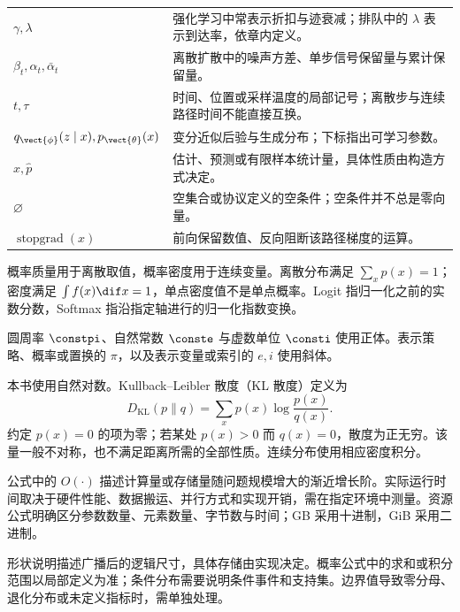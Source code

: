 \begin{longtable}{p{.18\linewidth}p{.73\linewidth}}
$\gamma,\lambda$ & 强化学习中常表示折扣与迹衰减；排队中的 $\lambda$ 表示到达率，依章内定义。\\
$\beta_t,\alpha_t,\bar\alpha_t$ & 离散扩散中的噪声方差、单步信号保留量与累计保留量。\\
$t,\tau$ & 时间、位置或采样温度的局部记号；离散步与连续路径时间不能直接互换。\\
$q_{\vect{\phi}}(z\mid x),p_{\vect{\theta}}(x)$ & 变分近似后验与生成分布；下标指出可学习参数。\\
$\widehat x,\widehat p$ & 估计、预测或有限样本统计量，具体性质由构造方式决定。\\
$\varnothing$ & 空集合或协议定义的空条件；空条件并不总是零向量。\\
$\operatorname{stopgrad}(x)$ & 前向保留数值、反向阻断该路径梯度的运算。\\
\bottomrule
\end{longtable}

概率质量用于离散取值，概率密度用于连续变量。离散分布满足 $\sum_xp(x)=1$；密度满足 $\int f(x)\dif x=1$，单点密度值不是单点概率。Logit 指归一化之前的实数分数，Softmax 指沿指定轴进行的归一化指数变换。

圆周率 $\constpi$、自然常数 $\conste$ 与虚数单位 $\consti$ 使用正体。表示策略、概率或置换的 $\pi$，以及表示变量或索引的 $e,i$ 使用斜体。

本书使用自然对数。Kullback--Leibler 散度（KL 散度）定义为
\begin{equation*}
 D_{\mathrm{KL}}(p\|q)=\sum_xp(x)\log\frac{p(x)}{q(x)}.
\end{equation*}
约定 $p(x)=0$ 的项为零；若某处 $p(x)>0$ 而 $q(x)=0$，散度为正无穷。该量一般不对称，也不满足距离所需的全部性质。连续分布使用相应密度积分。

公式中的 $O(\cdot)$ 描述计算量或存储量随问题规模增大的渐近增长阶。实际运行时间取决于硬件性能、数据搬运、并行方式和实现开销，需在指定环境中测量。资源公式明确区分参数数量、元素数量、字节数与时间；GB 采用十进制，GiB 采用二进制。

形状说明描述广播后的逻辑尺寸，具体存储由实现决定。概率公式中的求和或积分范围以局部定义为准；条件分布需要说明条件事件和支持集。边界值导致零分母、退化分布或未定义指标时，需单独处理。
